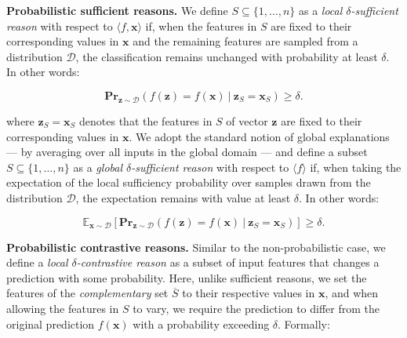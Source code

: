 \documentclass{article}
\newcommand{\z}{\textbf{z}}
\newcommand{\x}{\textbf{x}}
\begin{document}
\textbf{Probabilistic sufficient reasons.} We define $S\subseteq \{1,\ldots,n\}$ as a \emph{local $\delta$-sufficient reason} with respect to  $\langle f,\x\rangle$ if, when the features in $S$ are fixed to their corresponding values in $\x$ and the remaining features are sampled from a distribution $\mathcal{D}$, the classification remains unchanged with probability at least $\delta$. In other words:




\begin{equation}
\label{eq_suff_local}
    \textbf{Pr}_{\z\sim \mathcal{D}}(f(\z)=f(\x) \ | \  \z_S=\x_S)\geq \delta.
\end{equation}

where $\z_S = \x_S$ denotes that the features in $S$ of vector $\z$ are fixed to their corresponding values in $\x$. We adopt the standard notion of global explanations --- by averaging over all inputs in the global domain --- and define a subset $S \subseteq \{1, \ldots, n\}$ as a \emph{global $\delta$-sufficient reason} with respect to $\langle f \rangle$ if, when taking the expectation of the local sufficiency probability over samples drawn from the distribution $\mathcal{D}$, the expectation remains with value at least $\delta$. In other words:



\begin{equation}
\label{eq_suff_global}
\mathbb{E}_{\x\sim\mathcal{D}}[\textbf{Pr}_{\z\sim \mathcal{D}}(f(\z)=f(\x) \ | \  \z_S=\x_S)] \geq \delta.
\end{equation}

\textbf{Probabilistic contrastive reasons.} Similar to the non-probabilistic case, we define a \emph{local $\delta$-contrastive reason} as a subset of input features that changes a prediction with some probability. Here, unlike sufficient reasons, we set the features of the \emph{complementary} set $\overline{S}$ to their respective values in $\x$, and when allowing the features in $S$ to vary, we require the prediction to differ from the original prediction $f(\x)$ with a probability exceeding $\delta$. Formally:
\end{document}
